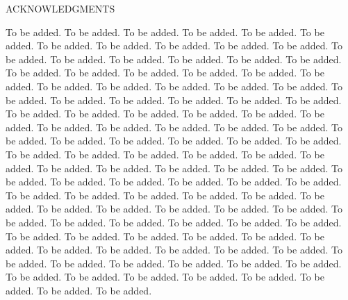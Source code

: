 ACKNOWLEDGMENTS

To be added. To be added. To be added. To be added. To be added. To be added. To be added. To be added. To be added. To be added. To be added. To be added. To be added. To be added. To be added. To be added. To be added. To be added. To be added. To be added. To be added. To be added. To be added. To be added. To be added. To be added. To be added. To be added. To be added. To be added. To be added. To be added. To be added. To be added. To be added. To be added. To be added. To be added. To be added. To be added. To be added. To be added. To be added. To be added. To be added. To be added. To be added. To be added. To be added. To be added. To be added. To be added. To be added. To be added. To be added. To be added. To be added. To be added. To be added. To be added. To be added. To be added. To be added. To be added. To be added. To be added. To be added. To be added. To be added. To be added. To be added. To be added. To be added. To be added. To be added. To be added. To be added. To be added. To be added. To be added. To be added. To be added. To be added. To be added. To be added. To be added. To be added. To be added. To be added. To be added. To be added. To be added. To be added. To be added. To be added. To be added. To be added. To be added. To be added. To be added. To be added. To be added. To be added. To be added. To be added. To be added. To be added. To be added. To be added. To be added. 